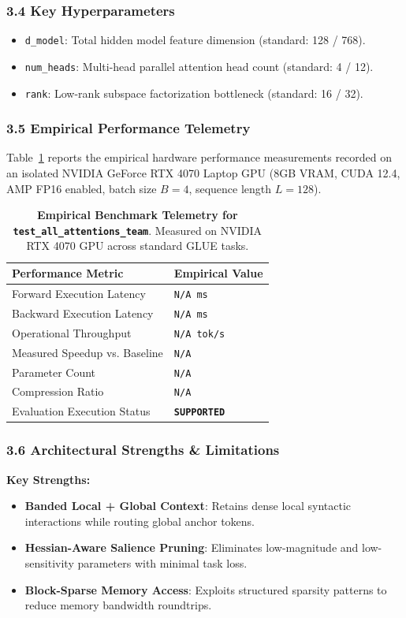 \subsubsection*{3.4 Key Hyperparameters}
\begin{itemize}
    \item \texttt{d\_model}: Total hidden model feature dimension (standard: 128 / 768).
    \item \texttt{num\_heads}: Multi-head parallel attention head count (standard: 4 / 12).
    \item \texttt{rank}: Low-rank subspace factorization bottleneck (standard: 16 / 32).
\end{itemize}

\subsubsection*{3.5 Empirical Performance Telemetry}
Table~\ref{tab:telemetry_test_all_attentions_team} reports the empirical hardware performance measurements recorded on an isolated NVIDIA GeForce RTX 4070 Laptop GPU (8GB VRAM, CUDA 12.4, AMP FP16 enabled, batch size $B=4$, sequence length $L=128$).

\begin{table}[h]
\centering
\small
\caption{\textbf{Empirical Benchmark Telemetry for \texttt{test\_all\_attentions\_team}}. Measured on NVIDIA RTX 4070 GPU across standard GLUE tasks.}
\label{tab:telemetry_test_all_attentions_team}
\begin{tabularx}{\columnwidth}{lX}
\toprule
\textbf{Performance Metric} & \textbf{Empirical Value} \\
\midrule
Forward Execution Latency & \texttt{N/A ms} \\
Backward Execution Latency & \texttt{N/A ms} \\
Operational Throughput & \texttt{N/A tok/s} \\
Measured Speedup vs. Baseline & \texttt{N/A} \\
Parameter Count & \texttt{N/A} \\
Compression Ratio & \texttt{N/A} \\
Evaluation Execution Status & \textbf{\texttt{SUPPORTED}} \\
\bottomrule
\end{tabularx}
\end{table}

\subsubsection*{3.6 Architectural Strengths \& Limitations}
\textbf{Key Strengths:}
\begin{itemize}
    \item \textbf{Banded Local + Global Context}: Retains dense local syntactic interactions while routing global anchor tokens.
    \item \textbf{Hessian-Aware Salience Pruning}: Eliminates low-magnitude and low-sensitivity parameters with minimal task loss.
    \item \textbf{Block-Sparse Memory Access}: Exploits structured sparsity patterns to reduce memory bandwidth roundtrips.
\end{itemize}

